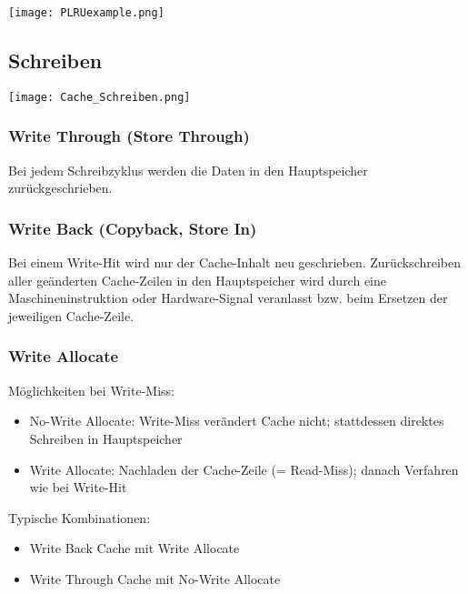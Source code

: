 \begin{center}
    \texttt{[image: PLRUexample.png]}
\end{center}

\subsection{Schreiben}

\begin{center}
    \texttt{[image: Cache\_Schreiben.png]}
\end{center}

\subsubsection{Write Through (Store Through)}

Bei jedem Schreibzyklus werden die Daten in den Hauptspeicher zurückgeschrieben.

\subsubsection{Write Back (Copyback, Store In)}

Bei einem Write-Hit wird nur der Cache-Inhalt neu geschrieben.
Zurückschreiben aller geänderten Cache-Zeilen in den Hauptspeicher wird
durch eine Maschineninstruktion oder Hardware-Signal veranlasst bzw. beim Ersetzen der jeweiligen Cache-Zeile.

\subsubsection{Write Allocate}

Möglichkeiten bei Write-Miss:
\begin{itemize}
    \itemsep-.5em 
    \item No-Write Allocate: Write-Miss verändert Cache nicht; stattdessen direktes Schreiben in Hauptspeicher
    \item Write Allocate: Nachladen der Cache-Zeile (= Read-Miss); danach Verfahren wie bei Write-Hit
\end{itemize}

Typische Kombinationen:
\begin{itemize}
    \itemsep-.5em 
    \item Write Back Cache mit Write Allocate
    \item Write Through Cache mit No-Write Allocate
\end{itemize}

